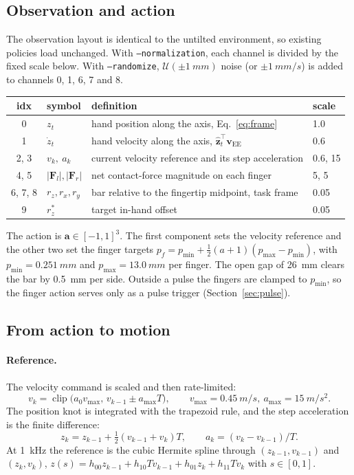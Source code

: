 \documentclass[10.5pt,a4paper]{article}
\newcommand{\code}[1]{\texttt{#1}}
\newcommand{\zt}{\hat{\bm z}_t}
\begin{document}
\subsection{Observation and action}
The observation layout is identical to the untilted environment, so existing policies load unchanged. With
\code{--normalization}, each channel is divided by the fixed scale below. With \code{--randomize},
$\mathcal U(\pm\SI{1}{mm})$ noise (or $\pm\SI{1}{mm/s}$) is added to channels 0, 1, 6, 7 and 8.
\begin{center}\small
\begin{tabular}{clll}
\toprule
idx & symbol & definition & scale\\
\midrule
0 & $z_t$ & hand position along the axis, Eq.~\eqref{eq:frame} & 1.0\\
1 & $\dot z_t$ & hand velocity along the axis, $\zt^{\!\top}\bm v_{\text{EE}}$ & 0.6\\
2, 3 & $v_k,\ a_k$ & current velocity reference and its step acceleration & 0.6, 15\\
4, 5 & $|\bm F_l|,|\bm F_r|$ & net contact-force magnitude on each finger & 5, 5\\
6, 7, 8 & $r_z, r_x, r_y$ & bar relative to the fingertip midpoint, task frame & 0.05\\
9 & $r_z^*$ & target in-hand offset & 0.05\\
\bottomrule
\end{tabular}
\end{center}
The action is $\bm a\in[-1,1]^3$. The first component sets the velocity reference and the other two set the
finger targets $p_f=p_{\min}+\tfrac12(a+1)(p_{\max}-p_{\min})$, with $p_{\min}=\SI{0.251}{mm}$ and
$p_{\max}=\SI{13.0}{mm}$ per finger. The open gap of \SI{26}{mm} clears the bar by \SI{0.5}{mm} per side.
Outside a pulse the fingers are clamped to $p_{\min}$, so the finger action serves only as a pulse trigger
(Section~\ref{sec:pulse}).

\subsection{From action to motion}
\paragraph{Reference.} The velocity command is scaled and then rate-limited:
\begin{equation}
v_k=\operatorname{clip}\!\bigl(a_{0}v_{\max},\,v_{k-1}\pm a_{\max}T\bigr),\qquad v_{\max}=\SI{0.45}{m/s},\ a_{\max}=\SI{15}{m/s^2}.
\end{equation}
The position knot is integrated with the trapezoid rule, and the step acceleration is the finite difference:
\begin{equation}
z_k=z_{k-1}+\tfrac12(v_{k-1}+v_k)T,\qquad a_k=(v_k-v_{k-1})/T.
\end{equation}
At \SI{1}{kHz} the reference is the cubic Hermite spline through $(z_{k-1},v_{k-1})$ and $(z_k,v_k)$,
$z(s)=h_{00}z_{k-1}+h_{10}Tv_{k-1}+h_{01}z_k+h_{11}Tv_k$ with $s\in[0,1]$.
\end{document}
